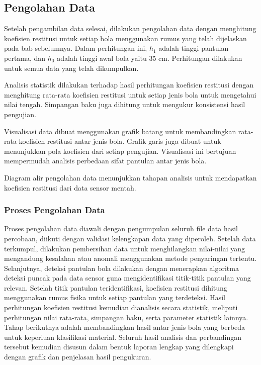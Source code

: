 \subsection{Pengolahan Data}
Setelah pengambilan data selesai, dilakukan pengolahan data dengan menghitung koefisien restitusi untuk setiap bola menggunakan rumus yang telah dijelaskan pada bab sebelumnya. Dalam perhitungan ini, $h_1$ adalah tinggi pantulan pertama, dan $h_0$ adalah tinggi awal bola yaitu 35 cm. Perhitungan dilakukan untuk semua data yang telah dikumpulkan.

Analisis statistik dilakukan terhadap hasil perhitungan koefisien restitusi dengan menghitung rata-rata koefisien restitusi untuk setiap jenis bola untuk mengetahui nilai tengah. Simpangan baku juga dihitung untuk mengukur konsistensi hasil pengujian.

Visualisasi data dibuat menggunakan grafik batang untuk membandingkan rata-rata koefisien restitusi antar jenis bola. Grafik garis juga dibuat untuk menunjukkan pola koefisien dari setiap pengujian. Visualisasi ini bertujuan mempermudah analisis perbedaan sifat pantulan antar jenis bola.

Diagram alir pengolahan data menunjukkan tahapan analisis untuk mendapatkan koefisien restitusi dari data sensor mentah.

\subsubsection{Proses Pengolahan Data}

Proses pengolahan data diawali dengan pengumpulan seluruh file data hasil percobaan, diikuti dengan validasi kelengkapan data yang diperoleh. Setelah data terkumpul, dilakukan pembersihan data untuk menghilangkan nilai-nilai yang mengandung kesalahan atau anomali menggunakan metode penyaringan tertentu. Selanjutnya, deteksi pantulan bola dilakukan dengan menerapkan algoritma deteksi puncak pada data sensor guna mengidentifikasi titik-titik pantulan yang relevan. Setelah titik pantulan teridentifikasi, koefisien restitusi dihitung menggunakan rumus fisika untuk setiap pantulan yang terdeteksi. Hasil perhitungan koefisien restitusi kemudian dianalisis secara statistik, meliputi perhitungan nilai rata-rata, simpangan baku, serta parameter statistik lainnya. Tahap berikutnya adalah membandingkan hasil antar jenis bola yang berbeda untuk keperluan klasifikasi material. Seluruh hasil analisis dan perbandingan tersebut kemudian disusun dalam bentuk laporan lengkap yang dilengkapi dengan grafik dan penjelasan hasil pengukuran.

